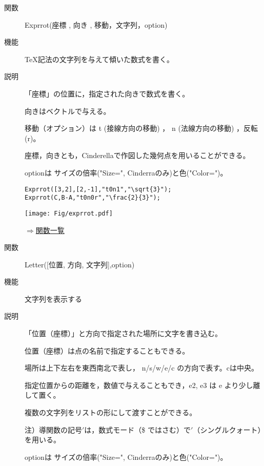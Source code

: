\documentclass[papersize,a4paper,10pt,uplatex]{jsarticle}
\begin{document}
\begin{description}
\vspace{\baselineskip}
\hypertarget{exprrot}{}
\item[関数]Exprrot(座標 , 向き , 移動，文字列，option)
\item[機能]\TeX 記法の文字列を与えて傾いた数式を書く。
\item[説明]「座標」の位置に，指定された向きで数式を書く。

向きはベクトルで与える。

移動（オプション）は t (接線方向の移動) ， n (法線方向の移動) ，反転 (r)。

座標，向きとも，Cinderellaで作図した幾何点を用いることができる。

optionは サイズの倍率("Size=", Cinderraのみ)と色("Color=")。

\begin{verbatim}
Exprrot([3,2],[2,-1],"t0n1","\sqrt{3}");
Exprrot(C,B-A,"t0n0r","\frac{2}{3}");
\end{verbatim}

\vspace{\baselineskip}
\hspace{10mm}\texttt{[image: Fig/exprrot.pdf]} \hspace{10mm} 

\begin{flushright}\hyperlink{functionlist}{$\Rightarrow$関数一覧}\end{flushright}

\vspace{\baselineskip}
\hypertarget{letter}{}\item[関数]Letter([位置, 方向, 文字列],option)
\item[機能]文字列を表示する
\item[説明]「位置（座標）」と方向で指定された場所に文字を書き込む。

位置（座標）は点の名前で指定することもできる。

場所は上下左右を東西南北で表し， n/s/w/e/c の方向で表す。cは中央。

指定位置からの距離を，数値で与えることもでき，e2, e3 は e より少し離して置く。

複数の文字列をリストの形にして渡すことができる。

注）導関数の記号$'$は，数式モード（\$ ではさむ）で$'$（シングルクォート）を用いる。

optionは サイズの倍率("Size=", Cinderraのみ)と色("Color=")。


\end{description}
\end{document}

